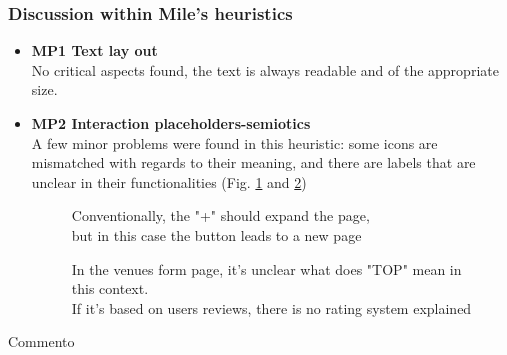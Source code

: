 \subsubsection{Discussion within Mile's heuristics}
\begin{itemize}
    \item \textbf{MP1 Text lay out}\\
    No critical aspects found, the text is always readable and of the appropriate size.\\
    \item \textbf{MP2 Interaction placeholders-semiotics}\\
    A few minor problems were found in this heuristic: some icons are mismatched with regards to their meaning, and there are labels that are unclear in their functionalities (Fig. \ref{MP2-1} and \ref{MP2-2})
    \begin{figure}[!ht]
        \begin{minipage}{\linewidth}
            \centering
            \captionsetup{justification=centering}
            \caption{Conventionally, the "+" should expand the page,\\but in this case the button leads to a new page}
            \label{MP2-1}
        \end{minipage}
    \end{figure}
    \begin{figure}[!ht]
        \begin{minipage}{\linewidth}
            \centering
            \captionsetup{justification=centering}
            \caption{In the venues form page, it's unclear what does "TOP" mean in this context.\\If it's based on users reviews, there is no rating system explained}
            \label{MP2-2}
        \end{minipage}
    \end{figure}
\end{itemize}

\pagebreak
Commento